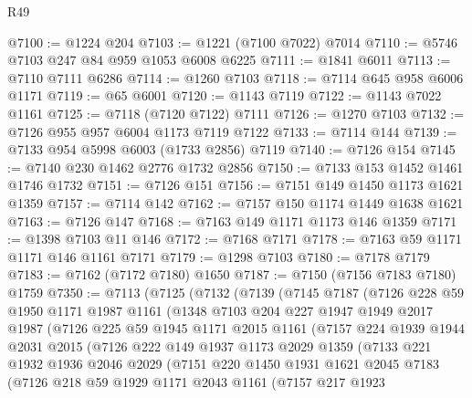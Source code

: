 \begin{lexlean}{R49}
\begin{coremodule}
@7100 := @1224 @204
@7103 := @1221 (@7100 @7022) @7014
@7110 := @5746 @7103 @247 @84 @959 @1053 @6008 @6225
@7111 := @1841 @6011
@7113 := @7110 @7111 @6286
@7114 := @1260 @7103
@7118 := @7114 @645 @958 @6006 @1171
@7119 := @65 @6001
@7120 := @1143 @7119
@7122 := @1143 @7022 @1161
@7125 := @7118 (@7120 @7122) @7111
@7126 := @1270 @7103
@7132 := @7126 @955 @957 @6004 @1173 @7119 @7122
@7133 := @7114 @144
@7139 := @7133 @954 @5998 @6003 (@1733 @2856) @7119
@7140 := @7126 @154
@7145 := @7140 @230 @1462 @2776 @1732 @2856
@7150 := @7133 @153 @1452 @1461 @1746 @1732
@7151 := @7126 @151
@7156 := @7151 @149 @1450 @1173 @1621 @1359
@7157 := @7114 @142
@7162 := @7157 @150 @1174 @1449 @1638 @1621
@7163 := @7126 @147
@7168 := @7163 @149 @1171 @1173 @146 @1359
@7171 := @1398 @7103 @11 @146
@7172 := @7168 @7171
@7178 := @7163 @59 @1171 @1171 @146 @1161 @7171
@7179 := @1298 @7103
@7180 := @7178 @7179
@7183 := @7162 (@7172 @7180) @1650
@7187 := @7150 (@7156 @7183 @7180) @1759
@7350 := @7113
    (@7125
      (@7132
        (@7139
          (@7145
            @7187
            (@7126
              @228
              @59
              @1950
              @1171
              @1987
              @1161
              (@1348
                @7103
                @204
                @227
                @1947
                @1949
                @2017
                @1987
                (@7126
                  @225
                  @59
                  @1945
                  @1171
                  @2015
                  @1161
                  (@7157
                    @224
                    @1939
                    @1944
                    @2031
                    @2015
                    (@7126
                      @222
                      @149
                      @1937
                      @1173
                      @2029
                      @1359
                      (@7133
                        @221
                        @1932
                        @1936
                        @2046
                        @2029
                        (@7151
                          @220
                          @1450
                          @1931
                          @1621
                          @2045
                          @7183
                          (@7126
                            @218
                            @59
                            @1929
                            @1171
                            @2043
                            @1161
                            (@7157
                              @217
                              @1923

\end{coremodule}
\end{lexlean}
